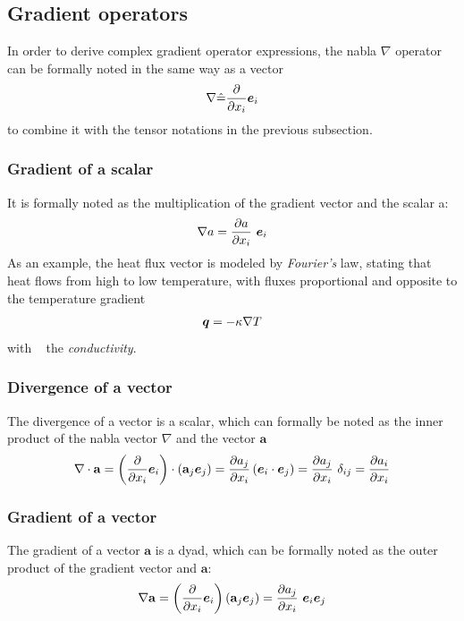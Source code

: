 \subsection{Gradient operators}
\label{subsec:principles:gradientOperators}

In order to derive complex gradient operator expressions, the nabla
$\nabla$ operator can be formally noted in the same way as a vector
\begin{align*}
  \nabla \hat =  \frac{\partial }{\partial x_i} \boldsymbol e_{i}
\end{align*}
to combine it with the tensor notations in the previous
subsection. 

\subsubsection{Gradient of a scalar} 

It is formally noted as the multiplication of the gradient vector and
the scalar a:
\begin{align*}
  \nabla a =  \frac{\partial a}{\partial x_i} ~\boldsymbol e_{i}
\end{align*}
As an example, the heat flux vector is modeled by \emph{Fourier's}
law, stating that heat flows from high to low temperature, with fluxes
proportional and opposite to the temperature gradient
\begin{align*}
  \boldsymbol {q} = - \kappa \nabla T
\end{align*}
with \conduct~ the \emph{conductivity}.

\subsubsection{Divergence of a vector} 

The divergence of a vector is a scalar, which can formally be noted as the inner product of the nabla vector $\nabla$ and the vector $\mathbf a$
\begin{align*}
  \nabla \cdot \mathbf a 
  = \left(\frac{\partial }{\partial x_i} \boldsymbol e_{i}\right) \cdot (\mathbf a_j \boldsymbol e_{j}) 
  = \frac{\partial a_j}{\partial x_i} \left(\boldsymbol e_{i} \cdot \boldsymbol e_{j}\right) = \frac{\partial a_j}{\partial x_i}~\delta_{ij} 
  = \frac{\partial a_i}{\partial x_i}
\end{align*}

\subsubsection{Gradient of a vector}

The gradient of a vector $\mathbf a$ is a dyad, which can be formally noted as the outer product of
the gradient vector and $\mathbf a$:
\begin{align*}
  \nabla \mathbf a 
  = \left(\frac{\partial }{\partial x_i} \boldsymbol e_{i}\right)  (\mathbf a_j \boldsymbol e_{j}) 
  = \frac{\partial a_j}{\partial x_i}~\boldsymbol e_{i}  \boldsymbol e_{j} 
\end{align*}

